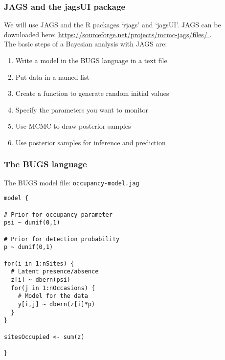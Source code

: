 \documentclass[color=usenames,dvipsnames]{beamer}\usepackage[]{graphicx}\usepackage[]{color}
\makeatletter
\newenvironment{kframe}{%
 \def\at@end@of@kframe{}%
 \ifinner\ifhmode%
  \def\at@end@of@kframe{\end{minipage}}%
  \begin{minipage}{\columnwidth}%
 \fi\fi%
 \def\FrameCommand##1{\hskip\@totalleftmargin \hskip-\fboxsep
 \colorbox{shadecolor}{##1}\hskip-\fboxsep
     \hskip-\linewidth \hskip-\@totalleftmargin \hskip\columnwidth}%
 \MakeFramed {\advance\hsize-\width
   \@totalleftmargin\z@ \linewidth\hsize
   \@setminipage}}%
 {\par\unskip\endMakeFramed%
 \at@end@of@kframe}
\newenvironment{knitrout}{}{} %
\makeatother
\begin{document}
\begin{frame}
  \frametitle{JAGS and the jagsUI package}
  We will use JAGS and the R packages `rjags' and `jagsUI'. JAGS can
  be downloaded here: \url{
    https://sourceforge.net/projects/mcmc-jags/files/
  }. \\
  \pause
  \vfill
  The basic steps of a Bayesian analysis with JAGS are:
  \begin{enumerate}%
    \item Write a model in the BUGS language in a text file
    \item Put data in a named list
    \item Create a function to generate random initial values
    \item Specify the parameters you want to monitor
    \item Use MCMC to draw posterior samples
    \item Use posterior samples for inference and prediction
  \end{enumerate}
\end{frame}



\begin{frame}[fragile]
  \frametitle{The BUGS language}
  The BUGS model file: {\tt occupancy-model.jag}
\begin{knitrout}\scriptsize
{}\color{fgcolor}\begin{kframe}
\begin{verbatim}
model {

# Prior for occupancy parameter
psi ~ dunif(0,1)

# Prior for detection probability
p ~ dunif(0,1)

for(i in 1:nSites) {
  # Latent presence/absence
  z[i] ~ dbern(psi)   
  for(j in 1:nOccasions) {
    # Model for the data
    y[i,j] ~ dbern(z[i]*p)
  }
}

sitesOccupied <- sum(z)

}
\end{verbatim}
\end{kframe}
\end{knitrout}
\end{frame}
\end{document}
